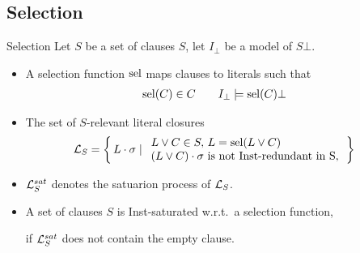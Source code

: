 \documentclass[%
handout,
]{beamer}
\begin{document}
\subsection{Selection}
\begin{frame}{Selection}
    Let $S$ be a set of clauses $S$, let $I_\bot$ be a model of $S\bot$.

    \vspace{0.7em}
    \begin{itemize}
        \item
    A selection function $\operatorname{sel}$ maps clauses to literals such that
    \begin{align*}
        \operatorname{sel}(C)&\in C
        &&&
        I_\bot&\models\operatorname{sel}(C)\bot
    \end{align*}

    \item
    The set of $S$-relevant literal closures
    \begin{align*}
        \mathcal{L}_S &= \left\{\, L\cdot\sigma \mid
        \begin{array}{l}
            L\lor C\in S,\,L = \operatorname{sel}(L\lor C)\\
            (L\lor C)\cdot\sigma\text{ is not Inst-redundant in S},\\
        \end{array}
        \,\right\}
    \end{align*}

    \item
    $\mathcal{L}_S^{sat}$ denotes the satuarion process of $\mathcal{L}_S$.

    \item A set of clauses $S$ is Inst-saturated w.r.t.~a selection function,

    if $\mathcal{L}_S^{sat}$ does not contain the empty clause.



\end{itemize}

\end{frame}
\end{document}

